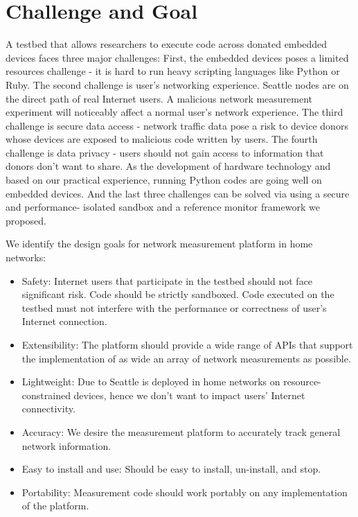 \section{Challenge and Goal}
\label{sec.goal}
A testbed that allows researchers to execute code across donated embedded 
devices faces three major challenges: First, the embedded devices poses a 
limited resources challenge - it is hard to run heavy scripting languages 
like Python or Ruby. The second challenge is user's networking experience. 
Seattle nodes are on the direct path of real Internet users. A malicious 
network measurement experiment will noticeably affect a normal user's 
network experience. The third challenge is secure data access - network 
traffic data pose a risk to device donors whose devices are exposed to 
malicious code written by users. The fourth challenge is data privacy - 
users should not gain access to information that donors don't want to share. 
As the development of hardware technology and based on our practical 
experience, running Python codes are going well on embedded devices. And the 
last three challenges can be solved via using a secure and performance-
isolated sandbox and a reference monitor framework we proposed.

We identify the design goals for network measurement platform in home 
networks:
\begin{itemize}
\item Safety: Internet users that participate in the testbed should not face 
significant risk. Code should be strictly sandboxed. Code executed on the 
testbed must not interfere with the performance or correctness of user's 
Internet connection.
\item Extensibility: The platform should provide a wide range of APIs that 
support the implementation of as wide an array of network measurements as 
possible.
\item Lightweight: Due to Seattle is deployed in home networks on resource-
constrained devices, hence we don't want to impact users' Internet 
connectivity.
\item Accuracy: We desire the measurement platform to accurately track 
general network information. 
\item Easy to install and use: Should be easy to install, un-install, and 
stop. 
\item Portability: Measurement code should work portably on any 
implementation of the platform.
\end{itemize}

